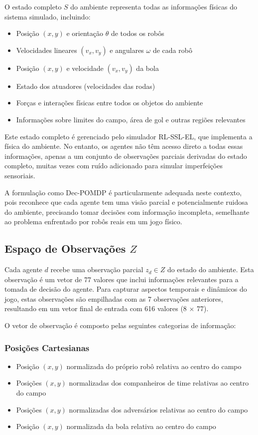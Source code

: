 O estado completo $S$ do ambiente representa todas as informações físicas do sistema simulado, incluindo:

\begin{itemize}
    \item Posição $(x, y)$ e orientação $\theta$ de todos os robôs
    \item Velocidades lineares $(v_x, v_y)$ e angulares $\omega$ de cada robô
    \item Posição $(x, y)$ e velocidade $(v_x, v_y)$ da bola
    \item Estado dos atuadores (velocidades das rodas)
    \item Forças e interações físicas entre todos os objetos do ambiente
    \item Informações sobre limites do campo, área de gol e outras regiões relevantes
\end{itemize}

Este estado completo é gerenciado pelo simulador RL-SSL-EL, que implementa a física do ambiente. No entanto, os agentes não têm acesso direto a todas essas informações, apenas a um conjunto de observações parciais derivadas do estado completo, muitas vezes com ruído adicionado para simular imperfeições sensoriais.

A formulação como Dec-POMDP é particularmente adequada neste contexto, pois reconhece que cada agente tem uma visão parcial e potencialmente ruidosa do ambiente, precisando tomar decisões com informação incompleta, semelhante ao problema enfrentado por robôs reais em um jogo físico.

\subsection{Espaço de Observações $Z$}

Cada agente $d$ recebe uma observação parcial $z_d \in Z$ do estado do ambiente. Esta observação é um vetor de 77 valores que inclui informações relevantes para a tomada de decisão do agente. Para capturar aspectos temporais e dinâmicos do jogo, estas observações são empilhadas com as 7 observações anteriores, resultando em um vetor final de entrada com 616 valores (8 × 77).

O vetor de observação é composto pelas seguintes categorias de informação:

\subsubsection{Posições Cartesianas}
\begin{itemize}
    \item Posição $(x, y)$ normalizada do próprio robô relativa ao centro do campo
    \item Posições $(x, y)$ normalizadas dos companheiros de time relativas ao centro do campo
    \item Posições $(x, y)$ normalizadas dos adversários relativas ao centro do campo
    \item Posição $(x, y)$ normalizada da bola relativa ao centro do campo
\end{itemize}

